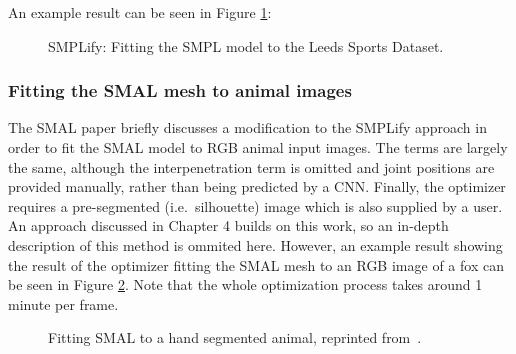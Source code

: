         An example result can be seen in Figure \ref{fig:smplify}:

        \begin{figure}[H] %
            \caption{SMPLify: Fitting the SMPL model to the Leeds Sports Dataset.}
            \label{fig:smplify}
        \end{figure}

        \subsubsection{Fitting the SMAL mesh to animal images}
        The SMAL paper briefly discusses a modification to the SMPLify approach in order to fit the SMAL model to RGB animal input images. The terms are largely the same, although the interpenetration term is omitted and joint positions are provided manually, rather than being predicted by a CNN. Finally, the optimizer requires a pre-segmented (i.e.\ silhouette) image which is also supplied by a user. An approach discussed in Chapter 4 builds on this work, so an in-depth description of this method is ommited here. However, an example result showing the result of the optimizer fitting the SMAL mesh to an RGB image of a fox can be seen in Figure \ref{fig:smalify}. Note that the whole optimization process takes around 1 minute per frame.

        \begin{figure}[H] %
            \caption{Fitting SMAL to a hand segmented animal, reprinted from~\cite{zuffi2017menagerie}.}
            \label{fig:smalify}
        \end{figure}

